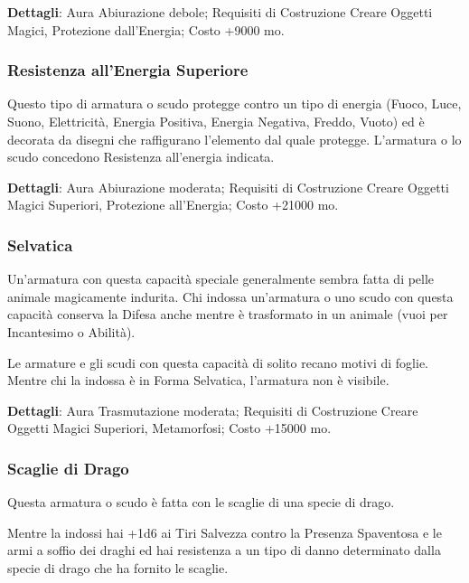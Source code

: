 \begin{multicols}{2}
	\textbf{Dettagli}: Aura Abiurazione debole; Requisiti di Costruzione Creare Oggetti Magici, Protezione dall'Energia; Costo +9000 mo.

	\subsubsection*{Resistenza all'Energia Superiore}

	Questo tipo di armatura o scudo protegge contro un tipo di energia (Fuoco, Luce, Suono, Elettricità, Energia Positiva, Energia Negativa, Freddo, Vuoto) ed è decorata da disegni che raffigurano l'elemento dal quale protegge. L'armatura o lo scudo concedono Resistenza all'energia indicata.

	\textbf{Dettagli}: Aura Abiurazione moderata; Requisiti di Costruzione Creare Oggetti Magici Superiori, Protezione all'Energia; Costo +21000 mo.

	\subsubsection*{Selvatica}

	Un'armatura con questa capacità speciale generalmente sembra fatta di pelle animale magicamente indurita. Chi indossa un'armatura o uno scudo con questa capacità conserva la Difesa anche mentre è trasformato in un animale (vuoi per Incantesimo o Abilità).

	Le armature e gli scudi con questa capacità di solito recano motivi di foglie. Mentre chi la indossa è in Forma Selvatica, l'armatura non è visibile.

	\textbf{Dettagli}: Aura Trasmutazione moderata; Requisiti di Costruzione Creare Oggetti Magici Superiori, Metamorfosi; Costo +15000 mo.

	\subsubsection*{Scaglie di Drago}

	Questa armatura o scudo è fatta con le scaglie di una specie di drago.

	Mentre la indossi hai +1d6 ai Tiri Salvezza contro la Presenza Spaventosa e le armi a soffio dei draghi ed hai resistenza a un tipo di danno determinato dalla specie di drago che ha fornito le scaglie.


\end{multicols}
